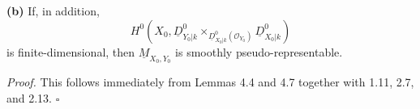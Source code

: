 \smallskip
\noindent\textbf{(b)}
If, in addition,
\[
H^0\!\left(
X_0,
\underline D^0_{Y_0|k}
\times_{\underline D^0_{X_0|k}(\mathcal O_{Y_0})}
\underline D^0_{X_0|k}
\right)
\]
is finite-dimensional, then $\underline M_{X_0,Y_0}$ is smoothly
pseudo-representable.

\medskip
\noindent\textit{Proof.}
This follows immediately from Lemmas 4.4 and 4.7 together with 1.11,
2.7, and 2.13. \hfill$\square$
